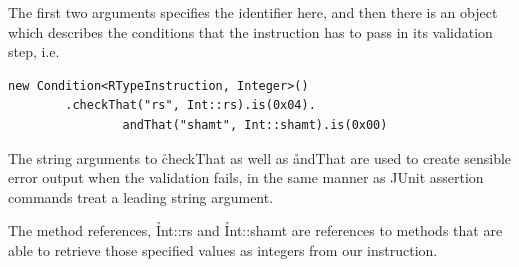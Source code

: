 \documentclass[a4paper]{article}
\begin{document}
The first two arguments specifies the identifier here, and
then there is an object which describes the conditions
that the instruction has to pass in its validation step, i.e.

\begin{verbatim}
new Condition<RTypeInstruction, Integer>()
        .checkThat("rs", Int::rs).is(0x04).
                andThat("shamt", Int::shamt).is(0x00)
\end{verbatim}

The string arguments to \h{checkThat} as well as \h{andThat} are used
to create sensible error output when the validation fails, in the same
manner as JUnit assertion commands treat a leading string argument.

The method references, \h{Int::rs} and \h{Int::shamt} are references
to methods that are able to retrieve those specified values as
integers from our instruction.
\end{document}
